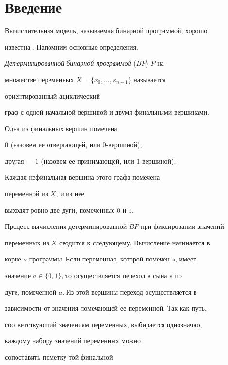 \label{begin}








\section{Введение}





Вычислительная модель, называемая бинарной программой, хорошо


известна \cite{W00}. Напомним основные определения.





{\em Детерминированной бинарной программой} ($BP$) $P$ на


множестве переменных $X{=}\{x_0,...,x_{n-1}\}$ называется




ориентированный ациклический


граф с одной начальной вершиной и двумя финальными вершинами.


Одна из финальных вершин помечена


$0$ (назовем ее отвергающей, или $0$-вершиной),


другая --- $1$ (назовем ее принимающей, или $1$-вершиной).


Каждая нефинальная вершина этого графа помечена


переменной из $X$, и из нее


выходят ровно две дуги, помеченные $0$ и $1$.


Процесс вычисления детерминированной $BP$ при фиксировании значений


переменных из $X$ сводится к следующему. Вычисление начинается в


корне $s$ программы. Если переменная, которой помечен $s$, имеет


значение $a\in \{0,1\}$, то осуществляется переход в сына $s$ по


дуге, помеченной $a$. Из этой вершины переход осуществляется в


зависимости от значения помечающей ее переменной. Так как путь,


соответствующий значениям переменных, выбирается однозначно, 


каждому набору значений переменных можно


сопоставить пометку той финальной


